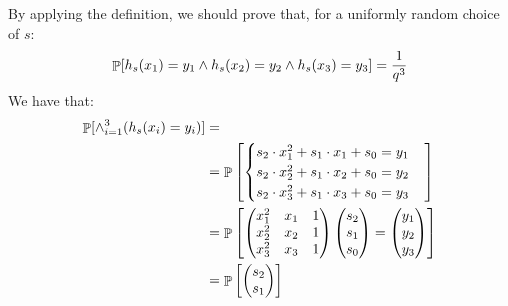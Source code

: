 \begin{enumerate}[(a)]
\begin{enumerate}[(i)]
		            \begin{solution}
			            By applying the definition, we should prove that, for a uniformly random choice of $s$:
			            \[ \mathop{\mathbb P}[h_s(x_1) = y_1 \wedge h_s(x_2) = y_2 \wedge h_s(x_3) = y_3] = \frac{1}{q^3} \]
			            We have that:
			            \begin{align*}
				            \mathop{\mathbb P}[\wedge_{i=1}^3 (h_s(x_i) = y_i)]            & =                              \\
				                                                         & =\mathop{\mathbb P}\begin{bmatrix}
					            \begin{cases}
						            s_2\cdot x_1^2 + s_1\cdot x_1 + s_0 = y_1 \\
						            s_2\cdot x_2^2 + s_1\cdot x_2 + s_0 = y_2 \\
						            s_2\cdot x_3^2 + s_1\cdot x_3 + s_0 = y_3
					            \end{cases}
				            \end{bmatrix}  \\
				                                                         & = \mathop{\mathbb P}\begin{bmatrix}
					            \begin{pmatrix}
						            x_1^2 & x_1 & 1 \\
						            x_2^2 & x_2 & 1 \\
						            x_3^2 & x_3 & 1
					            \end{pmatrix}
					            \begin{pmatrix}
						            s_2 \\
						            s_1 \\
						            s_0
					            \end{pmatrix}
					            =
					            \begin{pmatrix}
						            y_1 \\
						            y_2 \\
						            y_3
					            \end{pmatrix}
				            \end{bmatrix} \\
				                                                         & = \mathop{\mathbb P}\begin{bmatrix}
					            \begin{pmatrix}
						            s_2 \\
						            s_1 \\

\end{pmatrix}
\end{bmatrix}
\end{align*}
\end{solution}
\end{enumerate}
\end{enumerate}
